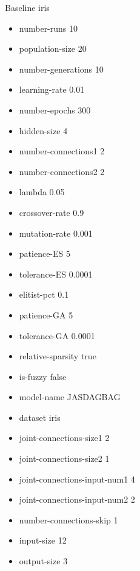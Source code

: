 Baseline
iris
\begin{itemize}
\item number-runs 10
\item population-size 20
\item number-generations 10
\item learning-rate 0.01
\item number-epochs 300
\item hidden-size 4
\item number-connections1 2
\item number-connections2 2
\item lambda 0.05
\item crossover-rate 0.9
\item mutation-rate 0.001
\item patience-ES 5
\item tolerance-ES 0.0001
\item elitist-pct 0.1
\item patience-GA 5
\item tolerance-GA 0.0001
\item relative-sparsity true
\item is-fuzzy false
\item model-name JASDAGBAG
\item dataset iris
\item joint-connections-size1 2
\item joint-connections-size2 1
\item joint-connections-input-num1 4
\item joint-connections-input-num2 2
\item number-connections-skip 1
\item input-size 12
\item output-size 3
\end{itemize}

